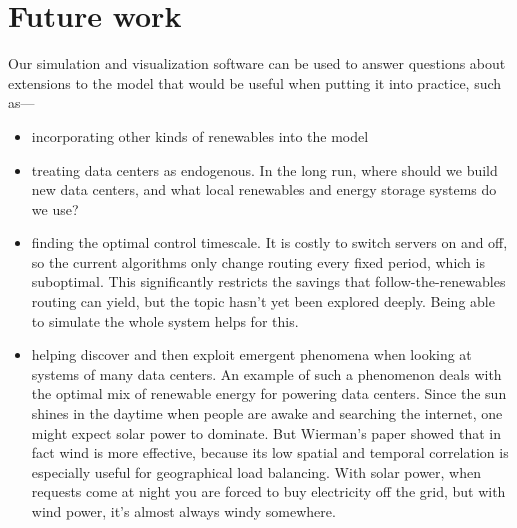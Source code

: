 \documentclass{acm_proc_article-sp}
\begin{document}
\section{Future work}
Our simulation and visualization software can be used to answer questions about extensions to the model that would be useful when putting it into practice, such as—
\begin{itemize}
\item incorporating other kinds of renewables into the model
\item treating data centers as endogenous. In the long run, where should we build new data centers, and what local renewables and energy storage systems do we use?
\item finding the optimal control timescale. It is costly to switch servers on and off, so the current algorithms only change routing every fixed period, which is suboptimal. This significantly restricts the savings that follow-the-renewables routing can yield, but the topic hasn’t yet been explored deeply. Being able to simulate the whole system helps for this.
\item helping discover and then exploit emergent phenomena when looking at systems of many data centers. An example of such a phenomenon deals with the optimal mix of renewable energy for powering data centers. Since the sun shines in the daytime when people are awake and searching the internet, one might expect solar power to dominate. But Wierman’s paper showed that in fact wind is more effective, because its low spatial and temporal correlation is especially useful for geographical load balancing. With solar power, when requests come at night you are forced to buy electricity off the grid, but with wind power, it’s almost always windy somewhere.
\end{itemize}



\end{document}
